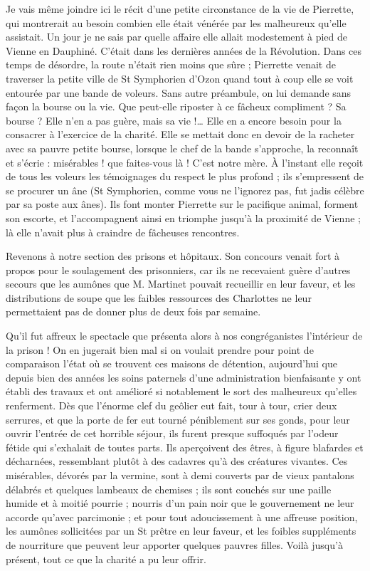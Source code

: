 Je vais même joindre ici le récit d'une petite circonstance de la vie de Pierrette, qui montrerait au besoin combien elle était vénérée par les malheureux qu'elle assistait. Un jour je ne sais par quelle affaire elle allait modestement à pied de Vienne en Dauphiné. C'était dans les dernières années de la Révolution. Dans ces temps de désordre, la route n'était rien moins que sûre ; Pierrette venait de traverser la petite ville de St Symphorien d'Ozon quand tout à coup elle se voit entourée par une bande de voleurs. Sans autre préambule, on lui demande sans façon la bourse ou la vie. Que peut-elle riposter à ce fâcheux compliment ? Sa bourse ? Elle n'en a pas guère, mais sa vie !… Elle en a encore besoin pour la consacrer à l'exercice de la charité. Elle se mettait donc en devoir de la racheter avec sa pauvre petite bourse, lorsque le chef de la bande s'approche, la reconnaît et s'écrie : misérables ! que faites-vous là ! C'est notre mère. À l'instant elle reçoit de tous les voleurs les témoignages du respect le plus profond ; ils s'empressent de se procurer un âne (St Symphorien, comme vous ne l'ignorez pas, fut jadis célèbre par sa poste aux ânes). Ils font monter Pierrette sur le pacifique animal, forment son escorte, et l'accompagnent ainsi en triomphe jusqu'à la proximité de Vienne ; là elle n'avait plus à craindre de fâcheuses rencontres.

Revenons à notre section des prisons et hôpitaux. Son concours venait fort à propos pour le soulagement des prisonniers, car ils ne recevaient guère d'autres secours que les aumônes que M. Martinet pouvait recueillir en leur faveur, et les distributions de soupe que
les faibles ressources des Charlottes ne leur permettaient pas de donner plus de deux fois par semaine.

Qu'il fut affreux le spectacle que présenta alors à nos congréganistes l'intérieur de la prison ! On en jugerait bien mal si on voulait prendre pour point de comparaison l'état où se trouvent ces maisons de détention, aujourd'hui que depuis bien des années les soins paternels d'une administration bienfaisante y ont établi des travaux et ont amélioré si notablement le sort des malheureux qu'elles renferment. Dès que l'énorme clef du geôlier eut fait, tour à tour, crier deux serrures, et que la porte de fer eut tourné péniblement sur ses gonds, pour leur ouvrir l'entrée de cet horrible séjour, ils furent presque suffoqués par l'odeur fétide qui s'exhalait de toutes parts. Ils aperçoivent des êtres, à figure blafardes et décharnées, ressemblant plutôt à des cadavres qu'à des créatures vivantes. Ces misérables, dévorés par la vermine, sont à demi couverts par de vieux pantalons délabrés et quelques lambeaux de chemises ; ils sont couchés sur une paille humide et à moitié pourrie ; nourris d'un pain noir que le gouvernement ne leur accorde qu'avec parcimonie ; et pour tout adoucissement à une affreuse position, les aumônes sollicitées par un St prêtre en leur faveur, et les foibles suppléments de nourriture que peuvent leur apporter quelques pauvres filles. Voilà jusqu'à présent, tout ce que la charité a pu leur offrir.

